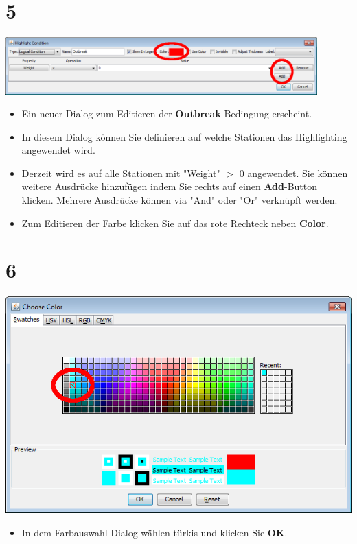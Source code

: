 \documentclass{beamer}
\begin{document}
\section{5}
\begin{frame}
	\begin{center}
  		\includegraphics[width=0.9\textwidth]{5.png}
	\end{center}
	\begin{itemize}
		\item Ein neuer Dialog zum Editieren der \textbf{Outbreak}-Bedingung erscheint.
		\item In diesem Dialog können Sie definieren auf welche Stationen das Highlighting angewendet wird.
		\item Derzeit wird es auf alle Stationen mit "Weight" $>$ 0 angewendet. Sie können weitere Ausdrücke hinzufügen indem Sie rechts auf einen \textbf{Add}-Button klicken. Mehrere Ausdrücke können via "And" oder "Or" verknüpft werden.
		\item Zum Editieren der Farbe klicken Sie auf das rote Rechteck neben \textbf{Color}.
	\end{itemize}
\end{frame}

\section{6}
\begin{frame}
	\begin{center}
  		\includegraphics[height=0.6\textheight]{6.png}
	\end{center}
	\begin{itemize}
		\item In dem Farbauswahl-Dialog wählen türkis und klicken Sie \textbf{OK}.
	\end{itemize}
\end{frame}
\end{document}
